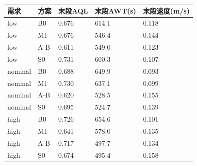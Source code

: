 \begin{tabular}{lllll}
\toprule
需求 & 方案 & 末段AQL & 末段AWT(s) & 末段速度(m/s) \\
\midrule
low & B0 & 0.676 & 614.1 & 0.118 \\
low & M1 & 0.676 & 546.4 & 0.144 \\
low & A-B & 0.611 & 549.0 & 0.123 \\
low & S0 & 0.731 & 600.3 & 0.107 \\
nominal & B0 & 0.688 & 649.9 & 0.093 \\
nominal & M1 & 0.730 & 637.1 & 0.099 \\
nominal & A-B & 0.620 & 528.5 & 0.155 \\
nominal & S0 & 0.695 & 524.7 & 0.139 \\
high & B0 & 0.726 & 654.6 & 0.101 \\
high & M1 & 0.641 & 578.0 & 0.135 \\
high & A-B & 0.717 & 497.7 & 0.134 \\
high & S0 & 0.674 & 495.4 & 0.158 \\
\bottomrule
\end{tabular}